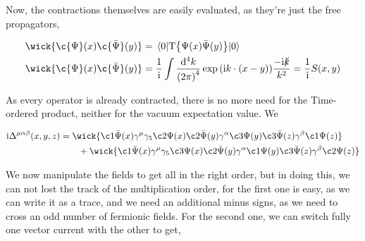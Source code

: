 Now, the contractions themselves are easily evaluated, as they're just the free propagators,

\begin{align}
    \wick{\c{\Psi}\qty(x)\c{\bar{\Psi}}\qty(y)}&=
    \mel{0}{\textnormal{T}\qty{\Psi\qty(x)\bar{\Psi}\qty(y)}}{0}\nonumber\\
    \wick{\c{\Psi}\qty(x)\c{\bar{\Psi}}\qty(y)}&=
    \frac1\im\int\frac{\dd[4]{k}}{\qty(2\pi)^4}\exp\qty(\im k\cdot \qty(x-y))\frac{-\im \slashed k}{k^2}=\frac1\im S\qty(x,y)\nonumber
\end{align}

As every operator is already contracted, there is no more need for the Time-ordered product, neither for the 
vacuum expectation value. We 

\begin{align}
    \im\Delta^{\mu\alpha\beta}\qty(x,y,z)&=\wick{\c1{\bar{\Psi}} \qty(x)\gamma^\mu\gamma_5\c2{\Psi} \qty(x)
        \c2{\bar{\Psi}} \qty(y)\gamma^\alpha\c3{\Psi} \qty(y)
        \c3{\bar{\Psi}} \qty(z)\gamma^\beta\c1{\Psi} \qty(z)}\nonumber\\
        &\quad\quad+\wick{\c1{\bar{\Psi}}\qty(x)\gamma^\mu\gamma_5\c3{\Psi}\qty(x)
        \c2{\bar{\Psi}}\qty(y)\gamma^\alpha\c1{\Psi}\qty(y)
        \c3{\bar{\Psi}}\qty(z)\gamma^\beta\c2{\Psi}\qty(z)}\nonumber
\end{align}

We now manipulate the fields to get all in the right order, but in doing this, we can not lost the track of 
the multiplication order, for the first one is easy, as we can write it as a trace, and we need an additional 
minus signs, as we need to cross an odd number of fermionic fields. For the second one, we can switch fully 
one vector current with the other to get,

